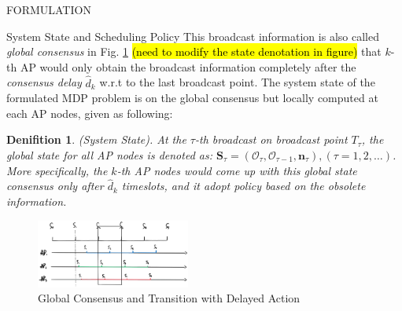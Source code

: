 \documentclass[10pt, conference, letterpaper]{IEEEtran}
\newtheorem{definition}{Denifition}
\renewcommand{\vec}{\mathbf}
\newcommand{\Stat}{\mathbf{S}}
\newcommand{\Obsv}{\mathcal{O}}
\begin{document}
\begin{section}{FORMULATION}
\begin{subsection}{System State and Scheduling Policy}
            This broadcast information is also called \emph{global consensus} in Fig. \ref{fig:br-trans} \hl{(need to modify the state denotation in figure)} that $k$-th AP would only obtain the broadcast information completely after the \emph{consensus delay} $\hat{d}_{k}$ w.r.t to the last broadcast point. The system state of the formulated MDP problem is on the global consensus but locally computed at each AP nodes, given as following:
            \begin{definition}(System State).
                At the $\tau$-th broadcast on broadcast point $T_\tau$, the global state for all AP nodes is denoted as: $\Stat_\tau = (\Obsv_{\tau}, \Obsv_{\tau-1}, \vec{n}_\tau), (\tau=1,2,\dots)$.
                More specifically, the $k$-th AP nodes would come up with this global state consensus only after $\hat{d}_k$ timeslots, and it adopt policy based on the obsolete information.
            \end{definition}
            \begin{figure}[ht]
                \centering
                \includegraphics[width=0.45\textwidth]{broadcast-trans.png}
                \caption{Global Consensus and Transition with Delayed Action}
                \label{fig:br-trans}
            \end{figure}


\end{subsection}
\end{section}
\end{document}
